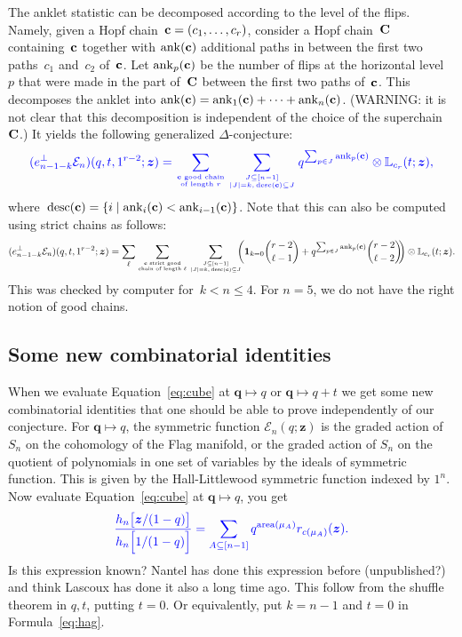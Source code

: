 \documentclass[12pt]{amsart}
\newcommand{\blue}[1]{\textcolor{blue}{#1}}
\newcommand{\green}[1]{\textcolor{green!75!black}{#1}}
\theoremstyle{plain}
\theoremstyle{definition}
\theoremstyle{remark}
\newcommand{\one}{\bm {1}}
\newcommand{\Qvar}{{\bm q}}
\newcommand{\Zvar}{{\bm z}}
\newcommand\area{\mathop{\mathrm{area}}}
\newcommand{\desc}{\mathop{\mathrm{desc}}}
\newcommand{\ank}{\mathop{\mathrm{ank}}}
\newcommand{\set}[2]{\left\{ #1 \;\middle|\; #2 \right\}} %
\begin{document}
The anklet statistic can be decomposed according to the level of the flips.
Namely, given a Hopf chain~${\bf c} = (c_1, \dots, c_r)$, consider a Hopf chain~${\bf C}$ containing~${\bf c}$ together with $\ank({\bf c})$ additional paths in between the first two paths~$c_1$ and~$c_2$ of~${\bf c}$.
Let $\ank_p({\bf c})$ be the number of flips at the horizontal level~$p$ that were made in the part of~${\bf C}$ between the first two paths of~${\bf c}$.
This decomposes the anklet into $\ank({\bf c}) = \ank_1({\bf c}) + \cdots + \ank_n({\bf c})$.
(\green{WARNING: it is not clear that this decomposition is independent of the choice of the superchain~${\bf C}$.})
It yields the following generalized $\Delta$-conjecture:
\[
\blue{
(e_{n-1-k}^\perp {\mathcal E}_n)(q, t, 1^{r-2};\Zvar) = \sum_{{\bf c} \text{ good chain} \atop \text{of length } r} \sum_{J \subseteq [n-1] \atop |J| = k, \, \desc({\bf c}) \subseteq J} q^{\sum_{p \in J} \ank_p({\bf c})} \otimes {\mathbb L}_{c_r}(t;\Zvar),
}
\]
where~$\desc({\bf c}) = \set{i}{\ank_i({\bf c}) < \ank_{i-1}({\bf c})}$.
Note that this can also be computed using strict chains as follows:
\[
(e_{n-1-k}^\perp {\mathcal E}_n)(q, t, 1^{r-2};\Zvar) = \sum_\ell \sum_{{\bf c} \text{ strict good} \atop \text{chain of length } \ell} \sum_{J \subseteq [n-1] \atop |J| = k, \, \desc({\bf c}) \subseteq J} \!\!\!\! \bigg( \one_{k = 0} \binom{r-2}{\ell-1} + q^{\sum_{p \in J} \ank_p({\bf c})} \binom{r-2}{\ell-2} \!\! \bigg) \otimes {\mathbb L}_{c_r}(t;\Zvar).
\]
This was checked by computer for~$k < n \le 4$. For $n = 5$, we do not have the right notion of good chains.

\subsection{Some new combinatorial identities}

When we evaluate Equation~\eqref{eq:cube} at $\Qvar\mapsto q$ or $\Qvar\mapsto q+t$ we get some new combinatorial identities that one should be able to prove independently of our conjecture.
For $\Qvar\mapsto q$, the symmetric function ${\mathcal E}_n(q;\Zvar)$ is the graded action of $S_n$ on the cohomology of the Flag manifold, or the graded action of $S_n$ on the quotient of polynomials in one set of variables by the ideals of symmetric function.
This is given by the Hall-Littlewood symmetric function indexed by $1^n$.
Now evaluate Equation~\eqref{eq:cube} at $\Qvar\mapsto q$, you get
\begin{equation}\label{eq:onevar}
\blue{
\frac{h_n\big[ {\Zvar}/{(1-q)}\big]}{h_n\Big[ {1}/{(1-q)}\Big]} = \sum_{A\subseteq[n-1]} q^{\area(\mu_A)} r_{c(\mu_A)}(\Zvar).
}
\end{equation}
Is this expression known? Nantel has done this expression before (unpublished?) and think Lascoux has done it also a long time ago. 
This follow from  the shuffle theorem in $q,t$, putting $t=0$. Or equivalently, put $k=n-1$ and $t=0$ in Formula~\eqref{eq:hag}.
\end{document}
